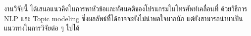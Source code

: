 
งานวิจัยนี้ ได้เสนอแนวคิดในการหาหัวข้อและทัศนคติของโปรแกรมในโทรศัพท์เคลื่อนที่ ด้วยวิธีการ NLP และ Topic modeling ซึ่งผลลัพธ์ที่ได้อาจจะยังไม่น่าพอใจมากนัก แต่ยังสามารถนำมาเป็นแนวทางในการวิจัยต่อ ๆ ไปได้

